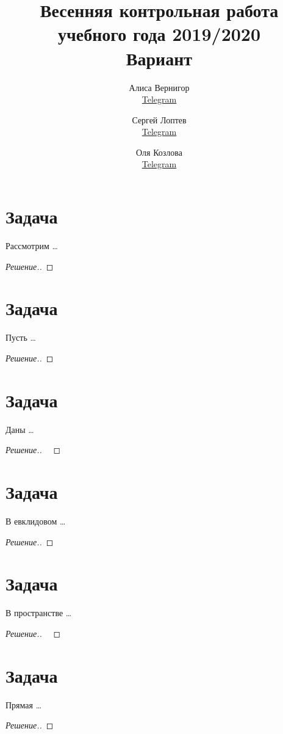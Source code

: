 \documentclass[a4paper]{article}
\title{Весенняя контрольная работа учебного года 2019/2020\\Вариант \textnumero 1}
\author{	
  Алиса Вернигор       \\ \href{https://t.me/allisyonok}{Telegram} \and
	Сергей Лоптев        \\ \href{https://t.me/beast_sl}{Telegram} \and
	Оля Козлова        \\ \href{https://t.me/grenlayk}{Telegram}
}
\date{}
\theoremstyle{remark}
\begin{document}
	\maketitle
    \section*{Задача }
        Рассмотрим \dots
        \begin{proof}[Решение.]
                
        \end{proof}	 
    
    \section*{Задача }
        Пусть \dots
        \begin{proof}[Решение.]

        \end{proof}
    
    \section*{Задача }
        Даны \dots
        \begin{proof}[Решение.] \ 
            
        \end{proof}
      
    \section*{Задача }
        В евклидовом \dots
        \begin{proof}[Решение.]
            
        \end{proof}
    
    \section*{Задача }
        В пространстве \dots
        \begin{proof}[Решение.] \ 

        \end{proof}

    \section*{Задача }
        Прямая \dots
        \begin{proof}[Решение.]
            
        \end{proof}
\end{document}
